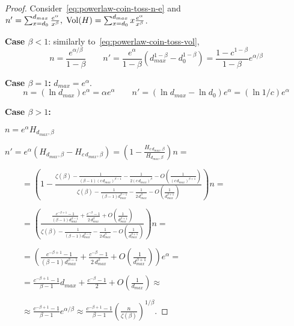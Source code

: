 \begin{proof}
    Consider~\eqref{eq:powerlaw-coin-toss-n-e} and
    $n'=\sum_{x=d_0}^{d_{max}}\frac{e^\alpha}{x^\beta},
    \;\operatorname*{Vol}(H)=\sum_{x=d_0}^{d_{max}}{x\frac{e^\alpha}{x^\beta}}$.
    
    \textbf{Case $\beta<1$}: similarly to~\eqref{eq:powerlaw-coin-toss-vol},
    \begin{equation*}
        n=\frac{e^{\alpha/\beta}}{1-\beta}
        \qquad n'=\frac{e^\alpha}{1-\beta}\left(d_{max}^{1-\beta}-d_0^{1-\beta}\right)
        =\frac{1-c^{1-\beta}}{1-\beta}e^{\alpha/\beta}
    \end{equation*}
    
    \textbf{Case $\beta=1$:}
    $d_{max}=e^\alpha$.
    \begin{equation*}
        n=\left(\ln d_{max}\right)e^\alpha=\alpha e^\alpha
        \qquad n'=(\ln d_{max}-\ln d_0)e^\alpha=(\ln 1/c)e^\alpha
    \end{equation*}

    \textbf{Case $\beta>1$:}
    
    $n=e^\alpha H_{d_{max},\beta}$
    
    $n'=e^\alpha\left(H_{d_{max},\beta}-H_{c\,d_{max},\beta}\right)
    =\left(1-\frac{H_{c\,d_{max},\beta}}{H_{d_{max},\beta}}\right)n=$
    
    $\qquad=\left(1-\frac{
        \zeta(\beta)-\frac{1}{(\beta-1)(c\,d_{max})^{\beta-1}}-\frac{1}{2(c\,d_{max})^\beta}-O\left(\frac{1}{(c\,d_{max})^{\beta+1}}\right)
    }{
        \zeta(\beta)-\frac{1}{(\beta-1)d_{max}^{\beta-1}}-\frac{1}{2\,d_{max}^\beta}-O\left(\frac{1}{d_{max}^{\beta+1}}\right)
    }\right)n=$

    $\qquad=\left(\frac{
        \frac{c^{-\beta+1}-1}{(\beta-1)d_{max}^{\beta-1}}+\frac{c^{-\beta}-1}{2\,d_{max}^\beta}+O\left(\frac{1}{d_{max}^{\beta+1}}\right)
    }{
        \zeta(\beta)-\frac{1}{(\beta-1)d_{max}^{\beta-1}}-\frac{1}{2\,d_{max}^\beta}-O\left(\frac{1}{d_{max}^{\beta+1}}\right)
    }\right)n=$

    $\qquad=\left(\frac{c^{-\beta+1}-1}{(\beta-1)d_{max}^{\beta-1}}+\frac{c^{-\beta}-1}{2\,d_{max}^\beta}+O\left(\frac{1}{d_{max}^{\beta+1}}\right)\right)e^\alpha=$
    
    $\qquad=\frac{c^{-\beta+1}-1}{\beta-1}d_{max}+\frac{c^{-\beta}-1}{2}+O\left(\frac{1}{d_{max}}\right)\approx$
    
    $\qquad\approx\frac{c^{-\beta+1}-1}{\beta-1}e^{\alpha/\beta}
    \approx\frac{c^{-\beta+1}-1}{\beta-1}\left(\frac{n}{\zeta(\beta)}\right)^{1/\beta}$.
    

\end{proof}
